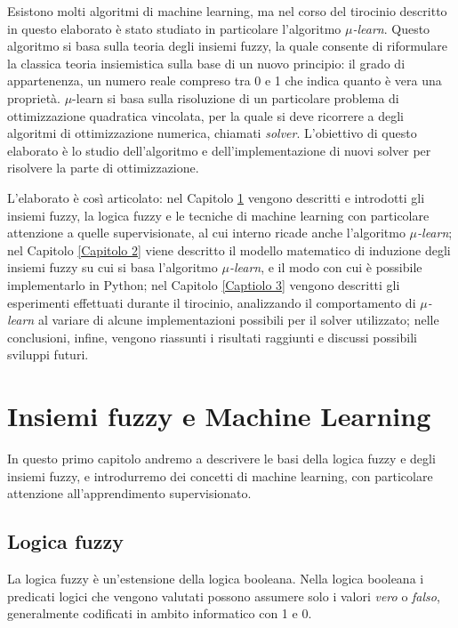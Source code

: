 \documentclass[a4paper,12pt]{report}
\begin{document}
Esistono molti algoritmi di machine learning, ma nel corso del tirocinio descritto in questo elaborato è stato studiato in particolare l'algoritmo \textit{$\mu$-learn}. Questo algoritmo si basa sulla teoria degli insiemi fuzzy, la quale consente di riformulare la classica teoria insiemistica sulla base di un nuovo principio: il grado di appartenenza, un numero reale compreso tra 0 e 1 che indica quanto è vera una proprietà. {$\mu$-learn} si basa sulla risoluzione di un particolare problema di ottimizzazione quadratica vincolata, per la quale si deve ricorrere a degli algoritmi di ottimizzazione numerica, chiamati \textit{solver}.
L'obiettivo di questo elaborato è lo studio dell'algoritmo e dell'implementazione di nuovi solver per risolvere la parte di ottimizzazione.

L'elaborato è così articolato: nel Capitolo \ref{Capitolo 1} vengono descritti e introdotti gli insiemi fuzzy, la logica fuzzy e le tecniche di machine learning con particolare attenzione a quelle supervisionate, al cui interno ricade anche l'algoritmo \textit{$\mu$-learn}; nel Capitolo \ref{Capitolo 2} viene descritto il modello matematico di induzione degli insiemi fuzzy su cui si basa l'algoritmo \textit{$\mu$-learn}, e il modo con cui è possibile implementarlo in Python; nel Capitolo \ref{Captiolo 3} vengono descritti gli esperimenti effettuati durante il tirocinio, analizzando il comportamento di \textit{$\mu$-learn} al variare di alcune implementazioni possibili per il solver utilizzato; nelle conclusioni, infine, vengono riassunti i risultati raggiunti e discussi possibili sviluppi futuri.


\chapter{Insiemi fuzzy e Machine Learning}
\label{Capitolo 1}
In questo primo capitolo andremo a descrivere le basi della logica fuzzy e degli insiemi fuzzy, e introdurremo dei concetti di machine learning, con particolare attenzione all'apprendimento supervisionato.

\section{Logica fuzzy}
La logica fuzzy \cite{logica_fuzzy} è un'estensione della logica booleana.
Nella logica booleana i predicati logici che vengono valutati possono assumere solo i valori \textit{vero} o \textit{falso}, generalmente codificati in ambito informatico con 1 e 0.
\end{document}
